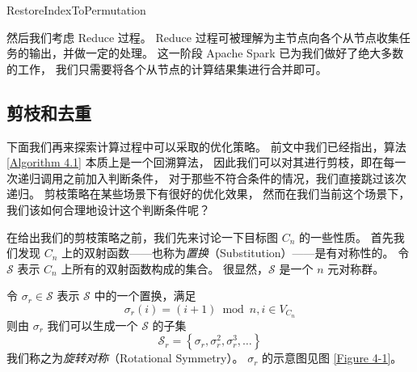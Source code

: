 \begin{algorithm}[h!]
\caption{RestoreIndexToPermutation}
\label{Algorithm 4.6}
\begin{algorithmic}[1]
	 
	 
	 

		 
	\EndFor
	\EndFor
\end{algorithmic}
\end{algorithm}

然后我们考虑 Reduce 过程。
Reduce 过程可被理解为主节点向各个从节点收集任务的输出，并做一定的处理。
这一阶段 Apache Spark 已为我们做好了绝大多数的工作，
我们只需要将各个从节点的计算结果集进行合并即可。

\subsection{剪枝和去重}
\label{Subsection 4.3.2}

下面我们再来探索计算过程中可以采取的优化策略。
前文中我们已经指出，算法 \ref{Algorithm 4.1} 本质上是一个回溯算法，
因此我们可以对其进行剪枝，即在每一次递归调用之前加入判断条件，
对于那些不符合条件的情况，我们直接跳过该次递归。
剪枝策略在某些场景下有很好的优化效果，
然而在我们当前这个场景下，我们该如何合理地设计这个判断条件呢？

在给出我们的剪枝策略之前，我们先来讨论一下目标图 $C_n$ 的一些性质。
首先我们发现 $C_n$ 上的双射函数——也称为\emph{置换}（Substitution）——是有对称性的。
令 $\mathcal{S}$ 表示 $C_n$ 上所有的双射函数构成的集合。
很显然，$\mathcal{S}$ 是一个 $n$ 元对称群。

令 $\sigma_r \in \mathcal{S}$ 表示 $\mathcal{S}$ 中的一个置换，满足
\begin{equation}
\sigma_r(i) = (i + 1) \bmod n, i \in V_{C_n}
\end{equation}
则由 $\sigma_r$ 我们可以生成一个 $\mathcal{S}$ 的子集
\begin{equation}
\mathcal{S}_r = \left\{\sigma_r, \sigma_r^2, \sigma_r^3, \dots\right\}
\end{equation}
我们称之为\emph{旋转对称}（Rotational Symmetry）。
$\sigma_r$ 的示意图见图 \ref{Figure 4-1}。

